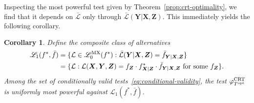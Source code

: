 \documentclass[ejs]{imsart}
\numberwithin{equation}{section}
\theoremstyle{plain}
\newtheorem{corollary}{Corollary}
\theoremstyle{definition}
\theoremstyle{remark}
\newcommand{\prx}{\bm X}
\newcommand{\prz}{\bm Z}
\newcommand{\pry}{{\bm Y}}
\def\CRT{\textnormal{CRT}}
\begin{document}
Inspecting the most powerful test given by Theorem~\ref{prop:crt-optimality}, we find that it depends on $\bar{\mathcal L}$ only through $\bar{\mathcal L}(\pry|\prx,\prz)$. This immediately yields the following corollary.

\begin{corollary} \label{cor:crt-optimality}
	Define the composite class of alternatives
	\begin{equation*}
	\begin{split}
	\mathscr L_1(f^*, \bar f) &= \{\mathcal L \in \mathscr L_0^{\textnormal{MX}}(f^*): \bar{\mathcal L}(\pry|\prx,\prz) = \bar f_{\pry|\prx,\prz}\} \\
	&= \{\mathcal L: \mathcal L(\prx,\pry,\prz) = f_{\prz} \cdot f^*_{\prx|\prz} \cdot \bar f_{\pry|\prx,\prz} \textnormal{ for some } f_{\prz}\}.
	\end{split}
	\end{equation*}
	Among the set of conditionally valid tests~\eqref{eq:conditional-validity}, the test $\varphi^{\CRT}_{T^{\textnormal{opt}}}$ is uniformly most powerful against $\mathscr L_1(f^*, \bar f)$.
\end{corollary}
\end{document}
